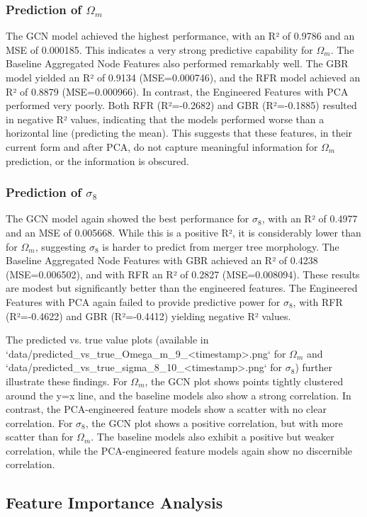\documentclass[twocolumn]{aastex631}
\begin{document}
\subsubsection{Prediction of $\Omega_m$}
The GCN model achieved the highest performance, with an R² of 0.9786 and an MSE of 0.000185. This indicates a very strong predictive capability for $\Omega_m$. The Baseline Aggregated Node Features also performed remarkably well. The GBR model yielded an R² of 0.9134 (MSE=0.000746), and the RFR model achieved an R² of 0.8879 (MSE=0.000966). In contrast, the Engineered Features with PCA performed very poorly. Both RFR (R²=-0.2682) and GBR (R²=-0.1885) resulted in negative R² values, indicating that the models performed worse than a horizontal line (predicting the mean). This suggests that these features, in their current form and after PCA, do not capture meaningful information for $\Omega_m$ prediction, or the information is obscured.

\subsubsection{Prediction of $\sigma_8$}
The GCN model again showed the best performance for $\sigma_8$, with an R² of 0.4977 and an MSE of 0.005668. While this is a positive R², it is considerably lower than for $\Omega_m$, suggesting $\sigma_8$ is harder to predict from merger tree morphology. The Baseline Aggregated Node Features with GBR achieved an R² of 0.4238 (MSE=0.006502), and with RFR an R² of 0.2827 (MSE=0.008094). These results are modest but significantly better than the engineered features. The Engineered Features with PCA again failed to provide predictive power for $\sigma_8$, with RFR (R²=-0.4622) and GBR (R²=-0.4412) yielding negative R² values.

The predicted vs. true value plots (available in `data/predicted_vs_true_Omega_m_9_<timestamp>.png` for $\Omega_m$ and `data/predicted_vs_true_sigma_8_10_<timestamp>.png` for $\sigma_8$) further illustrate these findings. For $\Omega_m$, the GCN plot shows points tightly clustered around the y=x line, and the baseline models also show a strong correlation. In contrast, the PCA-engineered feature models show a scatter with no clear correlation. For $\sigma_8$, the GCN plot shows a positive correlation, but with more scatter than for $\Omega_m$. The baseline models also exhibit a positive but weaker correlation, while the PCA-engineered feature models again show no discernible correlation.

\subsection{Feature Importance Analysis}
\end{document}
